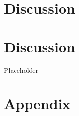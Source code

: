 \documentclass[]{book}
\begin{document}
\chapter{Discussion}\label{discussion}

\chapter{Discussion}\label{discussion-1}

Placeholder

\chapter{Appendix}\label{appendix}


\end{document}
